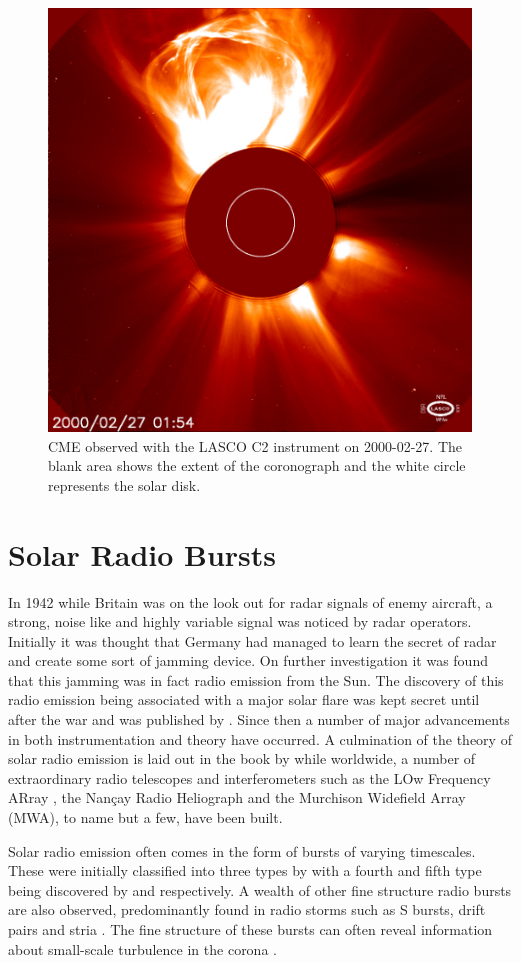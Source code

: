 \begin{figure}
    \centering
    \includegraphics[width=0.5\columnwidth]{Images/LASCO_C2_CME.jpg}
    \caption{CME observed with the LASCO C2 instrument on 2000-02-27. The blank area shows the extent of the coronograph and the white circle represents the solar disk.}
    \label{fig:CME}
\end{figure}

\section{Solar Radio Bursts}
In 1942 while Britain was on the look out for radar signals of enemy aircraft, a strong, noise like and highly variable signal was noticed by radar operators. Initially it was thought that Germany had managed to learn the secret of radar and create some sort of jamming device. On further investigation it was found that this jamming was in fact radio emission from the Sun. The discovery of this radio emission being associated with a major solar flare was kept secret until after the war and was published by \cite{Appleton1946}.
Since then a number of major advancements in both instrumentation and theory have occurred. A culmination of the theory of solar radio emission is laid out in the book by \cite{McLean1985} while worldwide, a number of extraordinary radio telescopes and interferometers such as the LOw Frequency ARray \cite[LOFAR,][]{VanHaarlem2013}, the Nan\c{c}ay Radio Heliograph and the Murchison Widefield Array (MWA), to name but a few, have been built.

Solar radio emission often comes in the form of bursts of varying timescales. These were initially classified into three types by \cite{Wild1950b} with a fourth and fifth type being discovered by \cite{Boischot1957} and \cite{Wild1959} respectively. A wealth of other fine structure radio bursts are also observed, predominantly found in radio storms such as S bursts, drift pairs and stria \citep{McConnell1980,Melrose1982,NelsonandMelrose1985}. 
The fine structure of these bursts can often reveal information about small-scale turbulence in the corona \citep{Kontar2017}.

